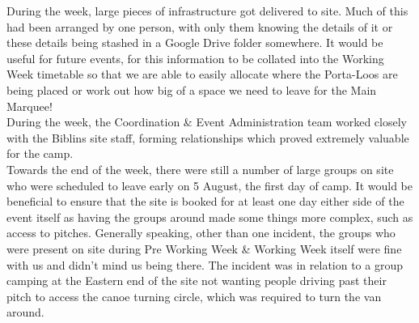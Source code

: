 During the week, large pieces of infrastructure got delivered to site. Much of this had been arranged by one person, with only them knowing the details of it or these details being stashed in a Google Drive folder somewhere. It would be useful for future events, for this information to be collated into the Working Week timetable so that we are able to easily allocate where the Porta-Loos are being placed or work out how big of a space we need to leave for the Main Marquee!\\

During the week, the Coordination \& Event Administration team worked closely with the Biblins site staff, forming relationships which proved extremely valuable for the camp.\\

Towards the end of the week, there were still a number of large groups on site who were scheduled to leave early on 5 August, the first day of camp. It would be beneficial to ensure that the site is booked for at least one day either side of the event itself as having the groups around made some things more complex, such as access to pitches. Generally speaking, other than one incident, the groups who were present on site during Pre Working Week \& Working Week itself were fine with us and didn't mind us being there. The incident was in relation to a group camping at the Eastern end of the site not wanting people driving past their pitch to access the canoe turning circle, which was required to turn the van around. 
